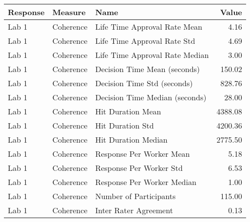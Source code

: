 \begin{tabular}{lllr}
\toprule
Response & Measure & Name & Value \\
\midrule
Lab 1 & Coherence & Life Time Approval Rate Mean & 4.16 \\
Lab 1 & Coherence & Life Time Approval Rate Std & 4.69 \\
Lab 1 & Coherence & Life Time Approval Rate Median & 3.00 \\
Lab 1 & Coherence & Decision Time Mean (seconds) & 150.02 \\
Lab 1 & Coherence & Decision Time Std (seconds) & 828.76 \\
Lab 1 & Coherence & Decision Time Median (seconds) & 28.00 \\
Lab 1 & Coherence & Hit Duration Mean & 4388.08 \\
Lab 1 & Coherence & Hit Duration Std & 4200.36 \\
Lab 1 & Coherence & Hit Duration Median & 2775.50 \\
Lab 1 & Coherence & Response Per Worker Mean & 5.18 \\
Lab 1 & Coherence & Response Per Worker Std & 6.53 \\
Lab 1 & Coherence & Response Per Worker Median & 1.00 \\
Lab 1 & Coherence & Number of Participants & 115.00 \\
Lab 1 & Coherence & Inter Rater Agreement & 0.13 \\
\bottomrule
\end{tabular}
